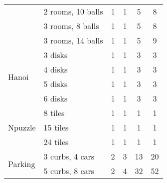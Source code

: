 \documentclass{article}
\begin{document}
\begin{table}[bt!]
{\begin{tabular}{ll|cc|cc}
                                & 2 rooms, 10 balls                 & 1                       & 1                        & 5                       & 8                        \\
                                & 3 rooms, 8 balls                  & 1                       & 1                        & 5                       & 8                        \\ 
                                & 3 rooms, 14 balls                 & 1                       & 1                        & 5                       & 9                        \\ \midrule
\multirow{4}{*}{Hanoi}       & 3 disks                           & 1                       & 1                        & 3                       & 3                        \\
                                & 4 disks                           & 1                       & 1                        & 3                       & 3                        \\
                                & 5 disks                           & 1                       & 1                        & 3                       & 3                        \\
                                & 6 disks                           & 1                       & 1                        & 3                       & 3                        \\ \midrule
\multirow{3}{*}{Npuzzle}     & 8 tiles                                 & 1                       & 1                        & 1                       & 1                        \\
                                & 15 tiles                                & 1                       & 1                        & 1                       & 1                        \\
                                & 24 tiles                                & 1                       & 1                        & 1                       & 1                        \\ \midrule
\multirow{4}{*}{Parking}     & 3 curbs, 4 cars                   & 2                       & 3                        & 13                      & 20                       \\
                                & 5 curbs, 8 cars                   & 2                       & 4                        & 32                      & 52                       \\

\end{tabular}}
\end{table}
\end{document}
